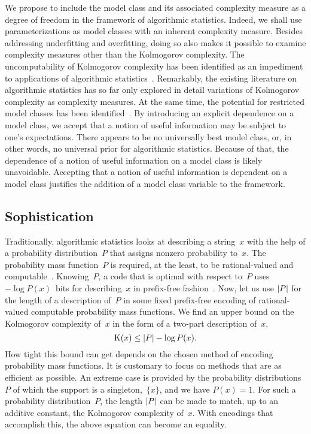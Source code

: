 We propose to include the model class and its associated complexity measure as a degree of freedom in the framework of algorithmic statistics.
Indeed, we shall use parameterizations as model classes with an inherent complexity measure.
Besides addressing underfitting and overfitting, doing so also makes it possible to examine complexity measures other than the Kolmogorov complexity.
The uncomputability of Kolmogorov complexity has been identified as an impediment to applications of algorithmic statistics~\parencite{rissanen1983universal,vereshchagin2017algorithmic}.
Remarkably, the existing literature on algorithmic statistics has so far only explored in detail variations of Kolmogorov complexity as complexity measures.
At the same time, the potential for restricted model classes has been identified~\parencite{bloem2014safe,vereshchagin2017algorithmic}.
By introducing an explicit dependence on a model class, we accept that a notion of useful information may be subject to one's expectations.
There appears to be no universally best model class, or, in other words, no universal prior for algorithmic statistics.
Because of that, the dependence of a notion of useful information on a model class is likely unavoidable.
\slogan[\label{slo:useful_information}]{Useful information is context-dependent.}
Accepting that a notion of useful information is dependent on a model class justifies the addition of a model class variable to the framework.

\subsection{Sophistication}
\label{sec:statistics:sophistication}%
Traditionally, algorithmic statistics looks at describing a string~$x$ with the help of a probability distribution~$P$ that assigns nonzero probability to~$x$.
The probability mass function~$P$ is required, at the least, to be rational-valued and computable~\parencite{vereshchagin2017algorithmic}.
Knowing~$P$, a code that is optimal with respect to~$P$ uses $-\log P(x)$~bits for describing~$x$ in prefix-free fashion~\parencite{cover2006elements}.
Now, let us use ${\lvert P\rvert}$ for the length of a description of~$P$ in some fixed prefix-free encoding of rational-valued computable probability mass functions.
We find an upper bound on the Kolmogorov complexity of~$x$ in the form of a two-part description of~$x$,
\begin{equation*}
  \operatorname{K}(x) \le {\lvert P\rvert} - \log P(x).
\end{equation*}
How tight this bound can get depends on the chosen method of encoding probability mass functions.
It is customary to focus on methods that are as efficient as possible.
An extreme case is provided by the probability distributions~$P$ of which the support is a singleton,~$\{x\}$, and we have $P(x) = 1$.
For such a probability distribution~$P$, the length ${\lvert P\rvert}$ can be made to match, up to an additive constant, the Kolmogorov complexity of~$x$.
With encodings that accomplish this, the above equation can become an equality.

